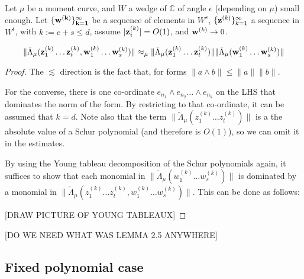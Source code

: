 
	\begin{lemma}
		\label{lem:transversality_corrected} Let $\mu$ be a moment curve, and $W$ a wedge of $\mathbb C$ of angle $\epsilon$ (depending on $\mu$) small enough. Let $\{\bf w^{(k)}\}_{k=1}^{\infty} $ be a sequence of elements in $ W^s$, $ \{{\bf z}^{(k)} \}_{k=1}^{\infty}$ a sequence in $ W^t$, with $k:=c+s\le d$, assume $|{\bf z}^{(k)}_i| = O(1)$, and ${\bf w}^{(k)} \to 0$.

		\begin{equation}
		\label{eq:transversality}
			\|\tilde \Lambda_\mu ({\bf z}^{(k)}_1 \dots {\bf z}^{(k)}_t, {\bf w}^{(k)}_1 \dots {\bf w}^{(k)}_s) \| \approx_\mu 
			\|\tilde \Lambda_\mu ({\bf z}^{(k)}_1 \dots {\bf z}^{(k)}_t)\|\|\tilde \Lambda_\mu( {\bf w}^{(k)}_1 \dots {\bf w}^{(k)}_s) \|
		\end{equation}
	\end{lemma}

	\begin{proof}
		The $\lesssim$ direction is the fact that, for forms $\|a\wedge b\| \le \|a\|\|b\|$. 

		For the converse, there is one co-ordinate $e_{n_1} \wedge e_{n_2} \dots \wedge e_{n_k}$ on the LHS that dominates the norm of the form. By restricting to that co-ordinate, it can be assumed that $k=d$. Note also that the term $\|\tilde \Lambda_\mu (z^{(k)}_1 \dots z^{(k)}_t)\|$ is a the absolute value of a Schur polynomial (and therefore is $O(1)$), so we can omit it in the estimates. 

		By using the Young tableau decomposition of the Schur polynomials again, it suffices to show that each monomial in $\| \tilde \Lambda_\mu( w^{(k)}_1 \dots w^{(k)}_s) \|$ is dominated by a monomial in $\|\tilde \Lambda_\mu (z^{(k)}_1 \dots z^{(k)}_t, w^{(k)}_1 \dots w^{(k)}_s) \|$. This can be done as follows:

		[DRAW PICTURE OF YOUNG TABLEAUX]
	\end{proof}

	[DO WE NEED WHAT WAS LEMMA 2.5 ANYWHERE]


	\subsection{Fixed polynomial case} %
	\label{sub:fixed_polynomial_case}

